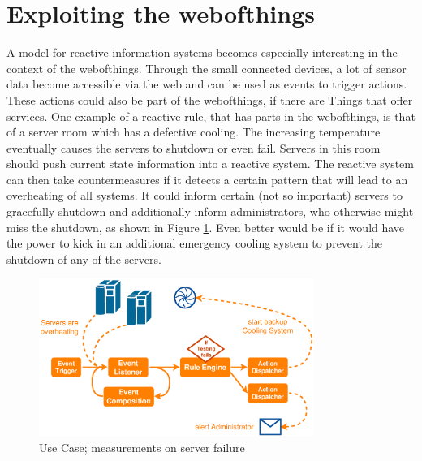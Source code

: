 \section{Exploiting the \gls{webofthings}}
A model for reactive information systems becomes especially interesting in the context of the \textrm{\gls{webofthings}}. 
Through the small connected devices, a lot of sensor data become accessible via the \textrm{\gls{web}} and can be used as events to trigger actions.
These actions could also be part of the \textrm{\gls{webofthings}}, if there are \textrm{Things} that offer services.
One example of a reactive rule, that has parts in the \textrm{\gls{webofthings}}, is that of a server room which has a defective cooling.
The increasing temperature eventually causes the servers to shutdown or even fail.
Servers in this room should push current state information into a reactive system.
The reactive system can then take countermeasures if it detects a certain pattern that will lead to an overheating of all systems.
It could inform certain (not so important) servers to gracefully shutdown and additionally inform administrators, who otherwise might miss the shutdown, as shown in Figure \ref{fig:WoT_Server}.
Even better would be if it would have the power to kick in an additional emergency cooling system to prevent the shutdown of any of the servers.
\begin{figure}[!ht]
  \centering
  \includegraphics[width=0.8\textwidth]{figures/WoT_Server}
  \caption{Use Case; measurements on server failure}
  \label{fig:WoT_Server}
\end{figure}


